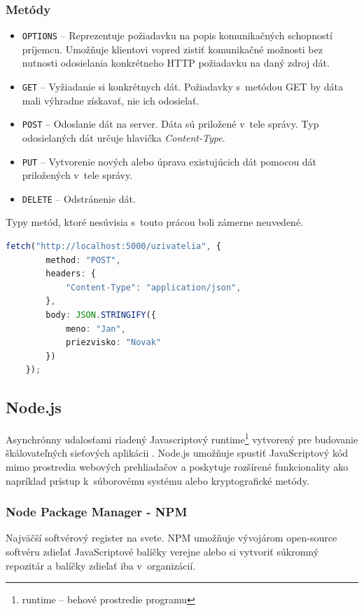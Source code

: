 \subsubsection{Metódy}
\begin{itemize}
	\item \texttt{OPTIONS} -- Reprezentuje požiadavku na popis komunikačných schopností príjemcu. Umožňuje klientovi vopred zistiť komunikačné možnosti bez nutnosti odosielania konkrétneho HTTP požiadavku na daný zdroj dát. \cite{MDN}
	\item \texttt{GET} -- Vyžiadanie si konkrétnych dát. Požiadavky s~metódou GET by dáta mali výhradne získavať, nie ich odosielať. \cite{MDN}
	\item \texttt{POST} -- Odoslanie dát na server. Dáta sú priložené v~tele správy. Typ odosielaných dát určuje hlavička \emph{Content-Type}. \cite{MDN}
	\item \texttt{PUT} -- Vytvorenie nových alebo úprava existujúcich dát pomocou dát priložených v~tele správy. \cite{MDN}
	\item \texttt{DELETE} -- Odstránenie dát. \cite{MDN}
\end{itemize}

\noindent Typy metód, ktoré nesúvisia s~touto prácou boli zámerne neuvedené. \\

\begin{lstlisting}[language=TypeScript, caption=Príklad odoslania HTTP POST metódy v~prostredí TypeScript.]
	fetch("http://localhost:5000/uzivatelia", {
		method: "POST",
		headers: {
			"Content-Type": "application/json",
		},
		body: JSON.STRINGIFY({
			meno: "Jan",
			priezvisko: "Novak"
		})
	});
\end{lstlisting}

\subsection{Node.js}
\label{subsection:nodejs}
Asynchrónny udalosťami riadený Javascriptový runtime\footnote{runtime -- behové prostredie programu} vytvorený pre budovanie škálovateľných sieťových aplikácii \cite{NodeJS}. Node.js umožňuje spustiť JavaScriptový kód mimo prostredia webových prehliadačov a poskytuje rozšírené funkcionality ako napríklad prístup k~súborovému systému alebo kryptografické metódy.

\subsubsection{Node Package Manager - NPM}
Najväčší softvérový register na svete. NPM umožňuje vývojárom open-source softvéru zdieľať JavaScriptové balíčky verejne alebo si vytvoriť súkromný repozitár a balíčky zdieľať iba v~organizácií. \cite{NPM} \\

